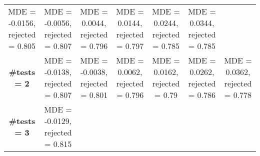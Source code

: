 \documentclass[
]{article}
\begin{document}
\begin{longtable}[]{@{}ccccccc@{}}
\begin{minipage}[t]{0.12\columnwidth}
MDE = -0.0156, rejected = 0.805\strut
\end{minipage} & \begin{minipage}[t]{0.12\columnwidth}\centering
MDE = -0.0056, rejected = 0.807\strut
\end{minipage} & \begin{minipage}[t]{0.12\columnwidth}\centering
MDE = 0.0044, rejected = 0.796\strut
\end{minipage} & \begin{minipage}[t]{0.12\columnwidth}\centering
MDE = 0.0144, rejected = 0.797\strut
\end{minipage} & \begin{minipage}[t]{0.12\columnwidth}\centering
MDE = 0.0244, rejected = 0.785\strut
\end{minipage} & \begin{minipage}[t]{0.12\columnwidth}\centering
MDE = 0.0344, rejected = 0.785\strut
\end{minipage}\tabularnewline
\begin{minipage}[t]{0.06\columnwidth}\centering
\textbf{\#tests = 2}\strut
\end{minipage} & \begin{minipage}[t]{0.12\columnwidth}\centering
MDE = -0.0138, rejected = 0.807\strut
\end{minipage} & \begin{minipage}[t]{0.12\columnwidth}\centering
MDE = -0.0038, rejected = 0.801\strut
\end{minipage} & \begin{minipage}[t]{0.12\columnwidth}\centering
MDE = 0.0062, rejected = 0.796\strut
\end{minipage} & \begin{minipage}[t]{0.12\columnwidth}\centering
MDE = 0.0162, rejected = 0.79\strut
\end{minipage} & \begin{minipage}[t]{0.12\columnwidth}\centering
MDE = 0.0262, rejected = 0.786\strut
\end{minipage} & \begin{minipage}[t]{0.12\columnwidth}\centering
MDE = 0.0362, rejected = 0.778\strut
\end{minipage}\tabularnewline
\begin{minipage}[t]{0.06\columnwidth}\centering
\textbf{\#tests = 3}\strut
\end{minipage} & \begin{minipage}[t]{0.12\columnwidth}\centering
MDE = -0.0129, rejected = 0.815\strut
\end{minipage} & \begin{minipage}[t]{0.12\columnwidth}\centering

\end{minipage}
\end{longtable}
\end{document}
